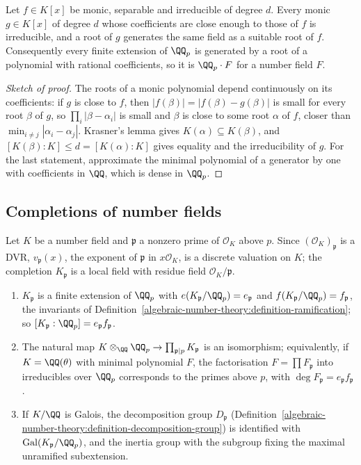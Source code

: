 \begin{corollary}\label{local-fields:corollary-krasner-polynomials}
Let $f \in K[x]$ be monic, separable and irreducible of degree $d$. Every monic $g \in K[x]$ of degree $d$ whose coefficients are close enough to those of $f$ is irreducible, and a root of $g$ generates
the same field as a suitable root of $f$. Consequently every finite extension of $\QQ_p$ is generated by a root of a polynomial with rational coefficients, so it is $\QQ_p \cdot F$ for a number field $F$.
\end{corollary}

\begin{proof}[Sketch of proof]
The roots of a monic polynomial depend continuously on its coefficients: if $g$ is close to $f$, then $|f(\beta)| = |f(\beta) - g(\beta)|$ is small for every root $\beta$ of $g$, so $\prod_i|\beta - \alpha_i|$ is small and
$\beta$ is close to some root $\alpha$ of $f$, closer than $\min_{i \neq j}|\alpha_i - \alpha_j|$. Krasner's lemma gives $K(\alpha) \subseteq K(\beta)$, and $[K(\beta) : K] \leq d = [K(\alpha) : K]$ gives equality and
the irreducibility of $g$. For the last statement, approximate the minimal polynomial of a generator by one with coefficients in $\QQ$, which is dense in $\QQ_p$.
\end{proof}

\subsection{Completions of number fields}\label{local-fields:subsection-completions}

Let $K$ be a number field and $\mathfrak{p}$ a nonzero prime of $\mathcal{O}_K$ above $p$. Since $(\mathcal{O}_K)_\mathfrak{p}$ is a DVR, $v_\mathfrak{p}(x)$, the exponent of $\mathfrak{p}$ in $x\mathcal{O}_K$, is a discrete
valuation on $K$; the completion $K_\mathfrak{p}$ is a local field with residue field $\mathcal{O}_K/\mathfrak{p}$.

\begin{theorem}\label{local-fields:theorem-completions}
\begin{enumerate}
\item $K_\mathfrak{p}$ is a finite extension of $\QQ_p$ with $e(K_\mathfrak{p}/\QQ_p) = e_\mathfrak{p}$ and $f(K_\mathfrak{p}/\QQ_p) = f_\mathfrak{p}$, the invariants of
Definition~\ref{algebraic-number-theory:definition-ramification}; so $[K_\mathfrak{p} : \QQ_p] = e_\mathfrak{p}f_\mathfrak{p}$.
\item The natural map $K \otimes_\QQ\QQ_p \to \prod_{\mathfrak{p} \mid p}K_\mathfrak{p}$ is an isomorphism; equivalently, if $K = \QQ(\theta)$ with minimal polynomial $F$, the factorisation $F = \prod F_\mathfrak{p}$ into
irreducibles over $\QQ_p$ corresponds to the primes above $p$, with $\deg F_\mathfrak{p} = e_\mathfrak{p}f_\mathfrak{p}$.
\item If $K/\QQ$ is Galois, the decomposition group $D_\mathfrak{p}$ (Definition~\ref{algebraic-number-theory:definition-decomposition-group}) is identified with $\mathrm{Gal}(K_\mathfrak{p}/\QQ_p)$, and the inertia group
with the subgroup fixing the maximal unramified subextension.
\end{enumerate}
\end{theorem}

